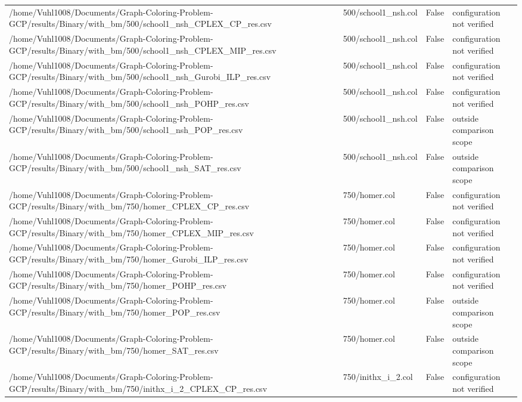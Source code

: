 \begin{table}[htbp]
\begin{tabular}{llll}
/home/Vuhl1008/Documents/Graph-Coloring-Problem-GCP/results/Binary/with\_bm/500/school1\_nsh\_CPLEX\_CP\_res.csv & 500/school1\_nsh.col & False & configuration not verified \\
/home/Vuhl1008/Documents/Graph-Coloring-Problem-GCP/results/Binary/with\_bm/500/school1\_nsh\_CPLEX\_MIP\_res.csv & 500/school1\_nsh.col & False & configuration not verified \\
/home/Vuhl1008/Documents/Graph-Coloring-Problem-GCP/results/Binary/with\_bm/500/school1\_nsh\_Gurobi\_ILP\_res.csv & 500/school1\_nsh.col & False & configuration not verified \\
/home/Vuhl1008/Documents/Graph-Coloring-Problem-GCP/results/Binary/with\_bm/500/school1\_nsh\_POHP\_res.csv & 500/school1\_nsh.col & False & configuration not verified \\
/home/Vuhl1008/Documents/Graph-Coloring-Problem-GCP/results/Binary/with\_bm/500/school1\_nsh\_POP\_res.csv & 500/school1\_nsh.col & False & outside comparison scope \\
/home/Vuhl1008/Documents/Graph-Coloring-Problem-GCP/results/Binary/with\_bm/500/school1\_nsh\_SAT\_res.csv & 500/school1\_nsh.col & False & outside comparison scope \\
/home/Vuhl1008/Documents/Graph-Coloring-Problem-GCP/results/Binary/with\_bm/750/homer\_CPLEX\_CP\_res.csv & 750/homer.col & False & configuration not verified \\
/home/Vuhl1008/Documents/Graph-Coloring-Problem-GCP/results/Binary/with\_bm/750/homer\_CPLEX\_MIP\_res.csv & 750/homer.col & False & configuration not verified \\
/home/Vuhl1008/Documents/Graph-Coloring-Problem-GCP/results/Binary/with\_bm/750/homer\_Gurobi\_ILP\_res.csv & 750/homer.col & False & configuration not verified \\
/home/Vuhl1008/Documents/Graph-Coloring-Problem-GCP/results/Binary/with\_bm/750/homer\_POHP\_res.csv & 750/homer.col & False & configuration not verified \\
/home/Vuhl1008/Documents/Graph-Coloring-Problem-GCP/results/Binary/with\_bm/750/homer\_POP\_res.csv & 750/homer.col & False & outside comparison scope \\
/home/Vuhl1008/Documents/Graph-Coloring-Problem-GCP/results/Binary/with\_bm/750/homer\_SAT\_res.csv & 750/homer.col & False & outside comparison scope \\
/home/Vuhl1008/Documents/Graph-Coloring-Problem-GCP/results/Binary/with\_bm/750/inithx\_i\_2\_CPLEX\_CP\_res.csv & 750/inithx\_i\_2.col & False & configuration not verified \\

\end{tabular}
\end{table}
